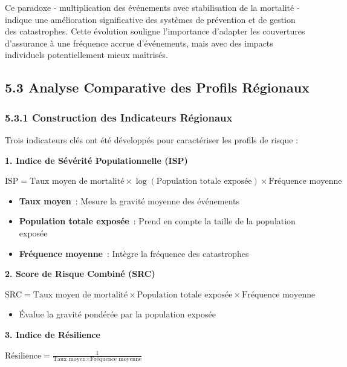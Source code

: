 \documentclass[
]{article}
\providecommand{\tightlist}{%
  \setlength{\itemsep}{0pt}\setlength{\parskip}{0pt}}
\begin{document}
Ce paradoxe - multiplication des événements avec stabilisation de la
mortalité - indique une amélioration significative des systèmes de
prévention et de gestion des catastrophes. Cette évolution souligne
l'importance d'adapter les couvertures d'assurance à une fréquence
accrue d'événements, mais avec des impacts individuels potentiellement
mieux maîtrisés.

\subsection{5.3 Analyse Comparative des Profils
Régionaux}\label{analyse-comparative-des-profils-ruxe9gionaux}

\subsubsection{5.3.1 Construction des Indicateurs
Régionaux}\label{construction-des-indicateurs-ruxe9gionaux}

Trois indicateurs clés ont été développés pour caractériser les profils
de risque :

\textbf{1. Indice de Sévérité Populationnelle (ISP)}

\(\text{ISP} = \text{Taux moyen de mortalité} \times \log(\text{Population totale exposée}) \times \text{Fréquence moyenne}\)

\begin{itemize}
\item
  \textbf{Taux moyen}~: Mesure la gravité moyenne des événements
\item
  \textbf{Population totale exposée}~: Prend en compte la taille de la
  population exposée
\item
  \textbf{Fréquence moyenne}~: Intègre la fréquence des catastrophes
\end{itemize}

\textbf{2. Score de Risque Combiné (SRC)}

\(\text{SRC} = \text{Taux moyen de mortalité} \times \text{Population totale exposée} \times \text{Fréquence moyenne}\)

\begin{itemize}
\tightlist
\item
  Évalue la gravité pondérée par la population exposée
\end{itemize}

\textbf{3. Indice de Résilience}

\(\text{Résilience} = \frac{1}{\text{Taux moyen} \times \text{Fréquence moyenne}}\)
\end{document}

